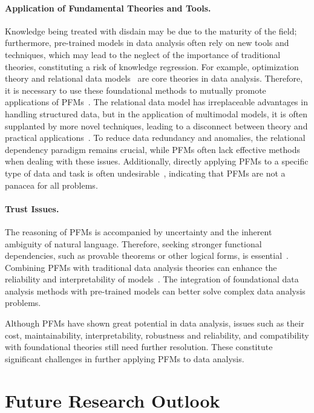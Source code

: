   \paragraph{Application of Fundamental Theories and Tools.} Knowledge being treated with disdain may be due to the maturity of the field; furthermore, pre-trained models in data analysis often rely on new tools and techniques, which may lead to the neglect of the importance of traditional theories, constituting a risk of knowledge regression. For example, optimization theory and relational data models~\cite{codd2007relational} are core theories in data analysis. Therefore, it is necessary to use these foundational methods to mutually promote applications of PFMs~\cite{li2024can}. The relational data model has irreplaceable advantages in handling structured data, but in the application of multimodal models, it is often supplanted by more novel techniques, leading to a disconnect between theory and practical applications~\cite{dinh2024large}. To reduce data redundancy and anomalies, the relational dependency paradigm remains crucial, while PFMs often lack effective methods when dealing with these issues. Additionally, directly applying PFMs to a specific type of data and task is often undesirable~\cite{tan2024language}, indicating that PFMs are not a panacea for all problems.
  
  \paragraph{Trust Issues.} The reasoning of PFMs is accompanied by uncertainty and the inherent ambiguity of natural language. Therefore, seeking stronger functional dependencies, such as provable theorems or other logical forms, is essential~\cite{morishita2023learning,pei2023can,abbe2023generalization,yang2024leandojo}. Combining PFMs with traditional data analysis theories can enhance the reliability and interpretability of models~\cite{khakhar2023pac}. The integration of foundational data analysis methods with pre-trained models can better solve complex data analysis problems.
  
  Although PFMs have shown great potential in data analysis, issues such as their cost, maintainability, interpretability, robustness and reliability, and compatibility with foundational theories still need further resolution. These constitute significant challenges in further applying PFMs to data analysis.
  
  
  
  
\section{Future Research Outlook}
  
